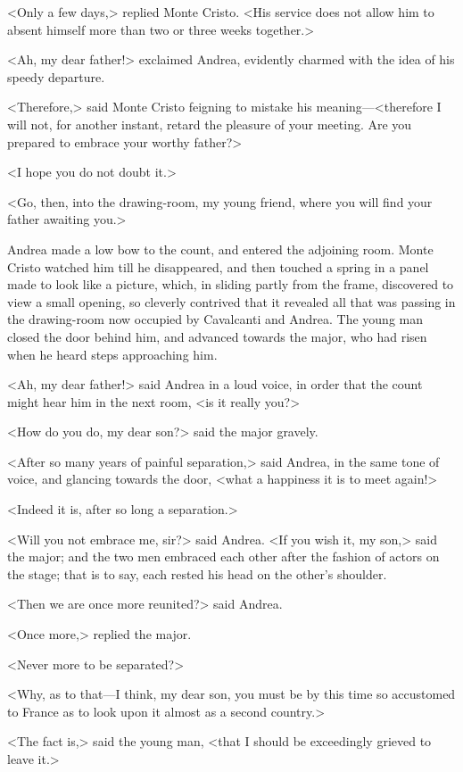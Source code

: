  <Only a few days,> replied Monte Cristo. <His service does not allow him to absent himself more than two or three weeks together.> 

 <Ah, my dear father!> exclaimed Andrea, evidently charmed with the idea of his speedy departure. 

 <Therefore,> said Monte Cristo feigning to mistake his meaning—<therefore I will not, for another instant, retard the pleasure of your meeting. Are you prepared to embrace your worthy father?> 

 <I hope you do not doubt it.>

<Go, then, into the drawing-room, my young friend, where you will find your father awaiting you.> 

 Andrea made a low bow to the count, and entered the adjoining room. Monte Cristo watched him till he disappeared, and then touched a spring in a panel made to look like a picture, which, in sliding partly from the frame, discovered to view a small opening, so cleverly contrived that it revealed all that was passing in the drawing-room now occupied by Cavalcanti and Andrea. The young man closed the door behind him, and advanced towards the major, who had risen when he heard steps approaching him. 

 <Ah, my dear father!> said Andrea in a loud voice, in order that the count might hear him in the next room, <is it really you?> 

 <How do you do, my dear son?> said the major gravely. 

 <After so many years of painful separation,> said Andrea, in the same tone of voice, and glancing towards the door, <what a happiness it is to meet again!> 

 <Indeed it is, after so long a separation.> 

 <Will you not embrace me, sir?> said Andrea.  <If you wish it, my son,> said the major; and the two men embraced each other after the fashion of actors on the stage; that is to say, each rested his head on the other's shoulder. 

 <Then we are once more reunited?> said Andrea. 

 <Once more,> replied the major. 

 <Never more to be separated?> 

 <Why, as to that—I think, my dear son, you must be by this time so accustomed to France as to look upon it almost as a second country.> 

 <The fact is,> said the young man, <that I should be exceedingly grieved to leave it.> 

